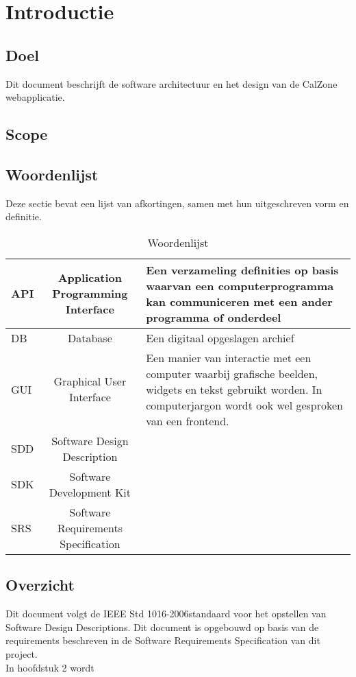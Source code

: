 \chapter{Introductie}

\section{Doel}
Dit document beschrijft de software architectuur en het design van de CalZone webapplicatie.
\section{Scope}

\section{Woordenlijst}
Deze sectie bevat een lijst van afkortingen, samen met hun uitgeschreven vorm en definitie.

\newcommand{\APIdef}{
Een verzameling definities op basis waarvan een computerprogramma kan communiceren met een ander programma of onderdeel}

\newcommand{\DBdef}{Een digitaal opgeslagen archief}
\newcommand{\GUIdef}{Een manier van interactie met een computer waarbij grafische beelden, widgets en tekst gebruikt worden. In computerjargon wordt ook wel gesproken van een frontend.}
\newcommand{\SDDdef}{ }
\newcommand{\SDKdef} { }
\newcommand{\SRSdef}{ }

\begin{table}[H]
	\begin{tabular}{|l|c|p{7cm}|}
	\hline
	API	& Application Programming Interface	&  \APIdef \\
	\hline
	DB	& Database	& \DBdef \\
	\hline
	GUI	& Graphical User Interface	& \GUIdef \\
	\hline
	SDD	& Software Design Description	& \SDDdef \\
	\hline
	SDK	& Software Development Kit	& \SDKdef \\
	\hline
	SRS	& Software Requirements Specification	& \SRSdef \\
	\hline
	\end{tabular}
	\caption{Woordenlijst}
	\label{tab:Woordenlijst}
\end{table}

\section{Overzicht}
Dit document volgt de IEEE Std 1016-2006\texttrademark \space standaard voor het opstellen van Software Design Descriptions. 
Dit document is opgebouwd op basis van de requirements beschreven in de Software Requirements Specification van dit project.\\
\noindent In hoofdstuk 2 wordt 